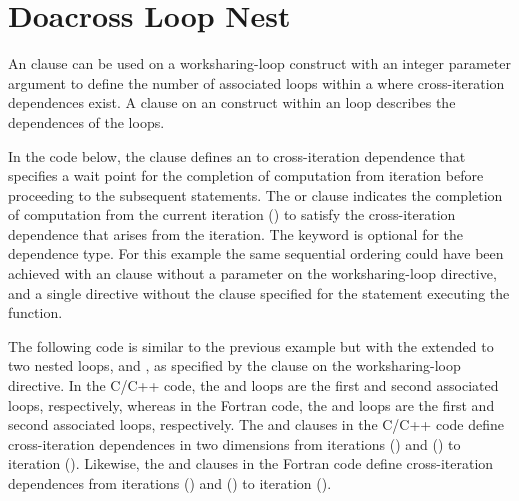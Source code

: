 \section{Doacross Loop Nest}
\label{sec:doacross}

An  clause can be used on a worksharing-loop construct with an integer
parameter argument to define the number of associated loops within 
a  where cross-iteration dependences exist.
A  clause on an  construct within an 
loop describes the dependences of the  loops. 

In the code below, the  clause defines an  
to  cross-iteration dependence that specifies a wait point for 
the completion of computation from iteration  before proceeding 
to the subsequent statements. The  
or  clause indicates 
the completion of computation from the current iteration () 
to satisfy the cross-iteration dependence that arises from the iteration.
The  keyword is optional for the 
dependence type.
For this example the same sequential ordering could have been achieved 
with an  clause without a parameter on the worksharing-loop directive,
and a single  directive without the  clause
specified for the statement executing the  function.



\pagebreak
The following code is similar to the previous example but with 
the  extended to two nested loops,  and ,
as specified by the  clause on the worksharing-loop directive.
In the C/C++ code, the  and  loops are the first and
second associated loops, respectively, whereas
in the Fortran code, the  and  loops are the first and
second associated loops, respectively.
The  and  clauses in 
the C/C++ code define cross-iteration dependences in two dimensions from 
iterations () and () to iteration ().  
Likewise, the  and  clauses 
in the Fortran code define cross-iteration dependences from iterations 
() and () to iteration ().

